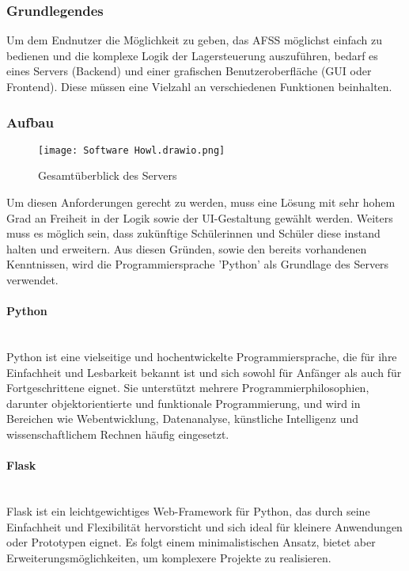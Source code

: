 \subsubsection{Grundlegendes}
Um dem Endnutzer die Möglichkeit zu geben, das AFSS möglichst einfach zu bedienen und die komplexe Logik der Lagersteuerung auszuführen, bedarf es eines Servers (Backend) und einer grafischen Benutzeroberfläche (GUI oder Frontend). Diese müssen eine Vielzahl an verschiedenen Funktionen beinhalten.

\subsubsection{Aufbau}
\begin{figure}[h]
    \texttt{[image: Software Howl.drawio.png]}
    \caption{Gesamtüberblick des Servers}
\end{figure}

Um diesen Anforderungen gerecht zu werden, muss eine Lösung mit sehr hohem Grad an Freiheit in der Logik sowie der UI-Gestaltung gewählt werden. Weiters muss es möglich sein, dass zukünftige Schülerinnen und Schüler diese instand halten und erweitern. Aus diesen Gründen, sowie den bereits vorhandenen Kenntnissen, wird die Programmiersprache 'Python' als Grundlage des Servers verwendet.

\paragraph{Python}\mbox{}\\
Python ist eine vielseitige und hochentwickelte Programmiersprache, die für ihre Einfachheit und Lesbarkeit bekannt ist und sich sowohl für Anfänger als auch für Fortgeschrittene eignet. Sie unterstützt mehrere Programmierphilosophien, darunter objektorientierte und funktionale Programmierung, und wird in Bereichen wie Webentwicklung, Datenanalyse, künstliche Intelligenz und wissenschaftlichem Rechnen häufig eingesetzt. \cite{chatgpt}

\paragraph{Flask}\mbox{}\\
Flask ist ein leichtgewichtiges Web-Framework für Python, das durch seine Einfachheit und Flexibilität hervorsticht und sich ideal für kleinere Anwendungen oder Prototypen eignet. Es folgt einem minimalistischen Ansatz, bietet aber Erweiterungsmöglichkeiten, um komplexere Projekte zu realisieren. \cite{chatgpt}

